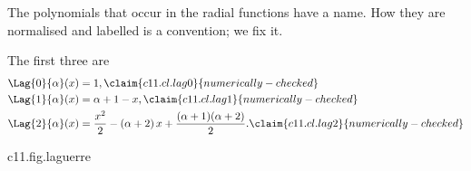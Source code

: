\begin{vertiefung}[id=c11.v2,
    titel={The general radial function},
    wozu={The Core text checks the solutions for $\nqn \leq 2$ by substitution. Here is
      the formula for all $\nqn$ and $\lqn$, the proof of Theorem~\ref{c11.thm.spektrum}
      and the proof that the prefactor normalises the radial functions.},
    voraussetzung={Core~\ref{c11.s4}. Not needed for Sections~\ref{c11.s5} to
      \ref{c11.s7}, which work with the functions for $\nqn \leq 2$ written out.},
    zurueck={For every $\nqn$ and every $\lqn < \nqn$ there is a normalised radial
      function at the energy $\En{\nqn}$: a polynomial of degree $\nqn - \lqn - 1$ times
      $\rad^{\lqn}$ times a decaying exponential.}]
  The polynomials that occur in the radial functions have a name. How they are
  normalised and labelled is a convention; we fix it.


  The first three are
  \begin{align}
    \Lag{0}{\alpha}(x) &= 1,
      \label{c11.eq.lag0}\claim{c11.cl.lag0}{numerically-checked} \\
    \Lag{1}{\alpha}(x) &= \alpha + 1 - x,
      \label{c11.eq.lag1}\claim{c11.cl.lag1}{numerically-checked} \\
    \Lag{2}{\alpha}(x) &= \frac{x^2}{2} - (\alpha + 2)\,x + \frac{(\alpha + 1)(\alpha + 2)}{2}.
      \label{c11.eq.lag2}\claim{c11.cl.lag2}{numerically-checked}
  \end{align}

  \begin{tpcfigure}{c11.fig.laguerre}
    \caption{The polynomials $\Lag{k}{1}$ for $k = 0, 1, 2, 3$ according to . The polynomial with index $k$ has degree $k$ and the value $k + 1$ at $x = 0$. With $\alpha = 1$ these are the polynomials that occur in the radial functions of the s states.}
  \end{tpcfigure}



\end{vertiefung}
